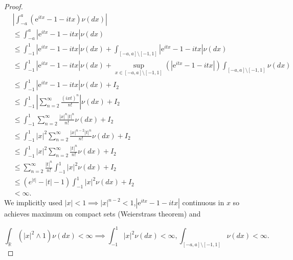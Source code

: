 \documentclass[a4paper,11pt]{article}
\begin{document}
\begin{proof}
    \begin{align}
         & \left|\int_{-a}^{a}\left(\mathrm{e}^{i tx}-1-itx\right) \nu(dx) \right|                                                                                                 \\
         & \leq \int_{-a}^{a}|\mathrm{e}^{i tx}-1-itx| \nu(dx)                                                                                                                     \\
         & \leq \int_{-1}^{1}|\mathrm{e}^{i tx}-1-itx| \nu(dx) + \int_{[-a,a] \setminus [-1,1]}|\mathrm{e}^{i tx}-1-itx| \nu(dx)                                                   \\
         & \leq \int_{-1}^{1}|\mathrm{e}^{i tx}-1-itx| \nu(dx) + \sup_{x \in [-a,a] \setminus [-1,1]}\left(|\mathrm{e}^{i tx}-1-itx|\right) \int_{[-a,a] \setminus [-1,1]} \nu(dx) \\
         & \leq \int_{-1}^{1}|\mathrm{e}^{i tx}-1-itx| \nu(dx) + I_{2}                                                                                                             \\
         & \leq \int_{-1}^{1}\left|\sum_{n=2}^{\infty} \frac{(ixt)^{n}}{n!}\right| \nu(dx) + I_{2}    \label{line: expansion in rep}                                               \\
         & \leq \int_{-1}^{1}\sum_{n=2}^{\infty} \frac{|x|^{n}|t|^{n}  }{n!} \nu(dx) + I_{2}                                                                                       \\
         & \leq \int_{-1}^{1}|x|^{2} \sum_{n=2}^{\infty} \frac{|x|^{n-2} |t| ^{n}}{n!} \nu(dx) + I_{2}                                                                             \\
         & \leq \int_{-1}^{1}|x|^{2} \sum_{n=2}^{\infty} \frac{|t|^{n}}{n!} \nu(dx) + I_{2}                                                                                        \\
         & \leq  \sum_{n=2}^{\infty} \frac{|t|^{n}}{n!} \int_{-1}^{1}|x|^{2} \nu(dx) + I_{2}                                                                                       \\
         & \leq  (e^{|t| }-|t| -1)  \int_{-1}^{1}|x|^{2} \nu(dx) + I_{2}       \label{line: end expansion in rep}                                                                  \\
         & < \infty
        .
    \end{align}
    We implicitly used $|x|<1 \implies |x|^{n-2}<1$,$|\mathrm{e}^{i tx}-1-itx|$ continuous in $x$ so achieves maximum on compact sets (Weierstrass theorem) and

    \begin{equation}
        \int_{\mathbb{R}} (|x|^{2} \wedge 1) \nu(dx)<\infty \implies \int_{-1}^{1} |x|^{2} \nu(dx)<\infty, \int_{[-a,a] \setminus [-1,1]} \nu(dx)<\infty   .
    \end{equation}

\end{proof}
\end{document}
